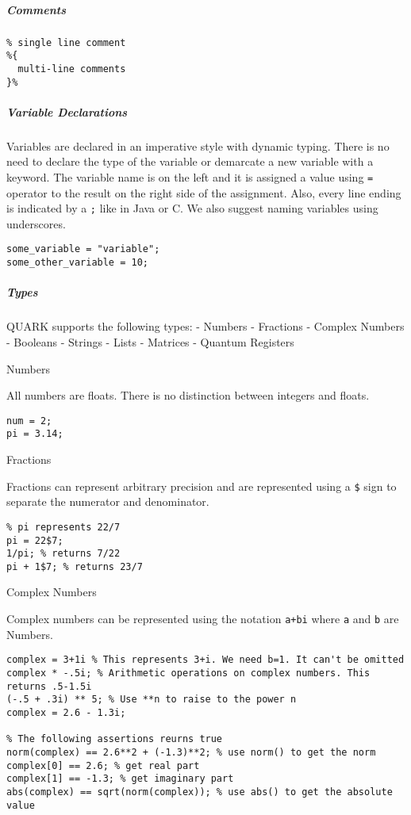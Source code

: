 \documentclass[]{article}
\begin{document}
\subparagraph{Comments}\label{comments}

\begin{verbatim}
% single line comment
%{
  multi-line comments
}%
\end{verbatim}

\subparagraph{Variable Declarations}\label{variable-declarations}

Variables are declared in an imperative style with dynamic typing. There
is no need to declare the type of the variable or demarcate a new
variable with a keyword. The variable name is on the left and it is
assigned a value using \texttt{=} operator to the result on the right
side of the assignment. Also, every line ending is indicated by a
\texttt{;} like in Java or C. We also suggest naming variables using
underscores.

\begin{verbatim}
some_variable = "variable";
some_other_variable = 10;
\end{verbatim}

\subparagraph{Types}\label{types}

QUARK supports the following types: - Numbers - Fractions - Complex
Numbers - Booleans - Strings - Lists - Matrices - Quantum Registers

Numbers

All numbers are floats. There is no distinction between integers and
floats.

\begin{verbatim}
num = 2;
pi = 3.14;
\end{verbatim}

Fractions

Fractions can represent arbitrary precision and are represented using a
\texttt{\$} sign to separate the numerator and denominator.

\begin{verbatim}
% pi represents 22/7
pi = 22$7;
1/pi; % returns 7/22
pi + 1$7; % returns 23/7
\end{verbatim}

Complex Numbers

Complex numbers can be represented using the notation \texttt{a+bi}
where \texttt{a} and \texttt{b} are Numbers.

\begin{verbatim}
complex = 3+1i % This represents 3+i. We need b=1. It can't be omitted
complex * -.5i; % Arithmetic operations on complex numbers. This returns .5-1.5i
(-.5 + .3i) ** 5; % Use **n to raise to the power n
complex = 2.6 - 1.3i;

% The following assertions reurns true
norm(complex) == 2.6**2 + (-1.3)**2; % use norm() to get the norm
complex[0] == 2.6; % get real part
complex[1] == -1.3; % get imaginary part
abs(complex) == sqrt(norm(complex)); % use abs() to get the absolute value
\end{verbatim}
\end{document}
